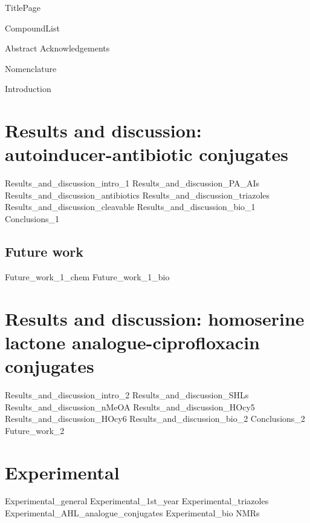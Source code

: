 \documentclass[10pt,a4paper,twoside]{article}
\begin{document}
{TitlePage}

{CompoundList}

\tableofcontents

{Abstract}
{Acknowledgements}

\newpage
{Nomenclature}
\printnomenclature

\newpage
{Introduction}

\newpage
\section{Results and discussion: autoinducer-antibiotic conjugates\label{sec:AACs}}
{Results_and_discussion_intro_1}
{Results_and_discussion_PA_AIs}
{Results_and_discussion_antibiotics}
{Results_and_discussion_triazoles}
{Results_and_discussion_cleavable}
{Results_and_discussion_bio_1}
{Conclusions_1}
\subsection{Future work \label{sec:Fut1}}
{Future_work_1_chem}
{Future_work_1_bio}

\newpage
\section{Results and discussion: homoserine lactone analogue-ciprofloxacin conjugates\label{sec:HSLCipCs}}
{Results_and_discussion_intro_2}
{Results_and_discussion_SHLs}
{Results_and_discussion_nMeOA}
{Results_and_discussion_HOcy5}
{Results_and_discussion_HOcy6}
{Results_and_discussion_bio_2}
{Conclusions_2}
{Future_work_2}

\newpage
\section{Experimental}
{Experimental_general}
{Experimental_1st_year}
{Experimental_triazoles}
{Experimental_AHL_analogue_conjugates}
{Experimental_bio}
{NMRs}


\newpage
{}


\end{document}
